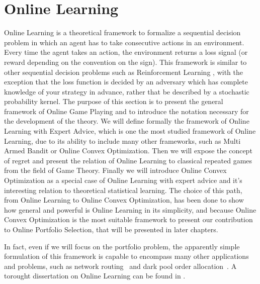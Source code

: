 \chapter{Online Learning}\label{ch:OnlineLearning}
Online Learning is a theoretical framework to formalize a sequential decision problem in which an agent has to take consecutive actions in an environment. Every time the agent takes an action, the environment returns a loss signal (or reward depending on the convention on the sign). This framework is similar to other sequential decision problems such as Reinforcement Learning \cite{sutton1998introduction}, with the exception that the loss function is decided by an adversary which has complete knowledge of your strategy in advance, rather that be described by a stochastic probability kernel.
The purpose of this section is to present the general framework of Online Game Playing and to introduce the notation necessary for the development of the theory. We will define formally the framework of Online Learning with Expert Advice, which is one the most studied framework of Online Learning, due to its ability to include many other frameworks, such as Multi Armed Bandit or Online Convex Optimization. 
Then we will expose the concept of regret and present the relation of Online Learning to classical repeated games from the field of Game Theory. Finally we will introduce Online Convex Optimization as a special case of Online Learning with expert advice and it's interesting relation to theoretical statistical learning. The choice of this path, from Online Learning to Online Convex Optimization, has been done to show how general and powerful is Online Learning in its simplicity, and because Online Convex Optimization is the most suitable framework to present our contribution to Online Portfolio Selection, that will be presented in later chapters.

In fact, even if we will focus on the portfolio problem, the apparently simple formulation of this framework is capable to encompass many other applications and problems, such as network routing~\cite{belmega2018online} and dark pool order allocation~\cite{agarwal2010optimal}. 
A torought dissertation on Online Learning can be found in \cite{cesa2006prediction}.

